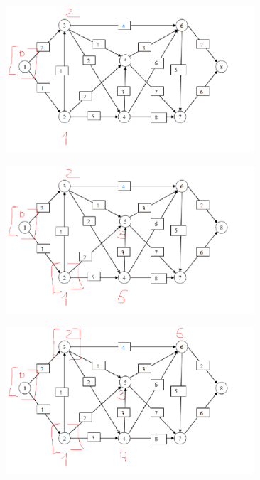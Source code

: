 \documentclass[12pt]{article}
\begin{document}
\begin{center}
\includegraphics[width=350]{14_1.png}
\end{center}
\begin{center}
\includegraphics[width=350]{14_2.png}
\end{center}
\begin{center}
\includegraphics[width=350]{14_3.png}
\end{center}
\end{document}
